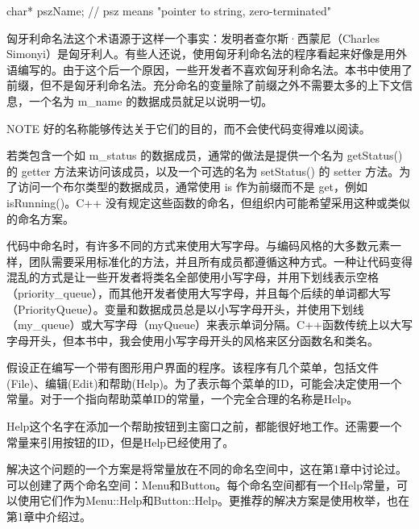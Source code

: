 \begin{cpp}
char* pszName; // psz means "pointer to string, zero-terminated"
\end{cpp}

匈牙利命名法这个术语源于这样一个事实：发明者查尔斯·西蒙尼（Charles Simonyi）是匈牙利人。有些人还说，使用匈牙利命名法的程序看起来好像是用外语编写的。由于这个后一个原因，一些开发者不喜欢匈牙利命名法。本书中使用了前缀，但不是匈牙利命名法。充分命名的变量除了前缀之外不需要太多的上下文信息，一个名为 m\_name 的数据成员就足以说明一切。

\begin{myNotic}{NOTE}
好的名称能够传达关于它们的目的，而不会使代码变得难以阅读。
\end{myNotic}


若类包含一个如 m\_status 的数据成员，通常的做法是提供一个名为 getStatus() 的 getter 方法来访问该成员，以及一个可选的名为 setStatus() 的 setter 方法。为了访问一个布尔类型的数据成员，通常使用 is 作为前缀而不是 get，例如 isRunning()。C++ 没有规定这些函数的命名，但组织内可能希望采用这种或类似的命名方案。


代码中命名时，有许多不同的方式来使用大写字母。与编码风格的大多数元素一样，团队需要采用标准化的方法，并且所有成员都遵循这种方式。一种让代码变得混乱的方式是让一些开发者将类名全部使用小写字母，并用下划线表示空格（priority\_queue），而其他开发者使用大写字母，并且每个后续的单词都大写（PriorityQueue）。变量和数据成员总是以小写字母开头，并使用下划线（my\_queue）或大写字母（myQueue）来表示单词分隔。C++函数传统上以大写字母开头，但本书中，我会使用小写字母开头的风格来区分函数名和类名。


假设正在编写一个带有图形用户界面的程序。该程序有几个菜单，包括文件(File)、编辑(Edit)和帮助(Help)。为了表示每个菜单的ID，可能会决定使用一个常量。对于一个指向帮助菜单ID的常量，一个完全合理的名称是Help。

Help这个名字在添加一个帮助按钮到主窗口之前，都能很好地工作。还需要一个常量来引用按钮的ID，但是Help已经使用了。

解决这个问题的一个方案是将常量放在不同的命名空间中，这在第1章中讨论过。可以创建了两个命名空间：Menu和Button。每个命名空间都有一个Help常量，可以使用它们作为Menu::Help和Button::Help。更推荐的解决方案是使用枚举，也在第1章中介绍过。


